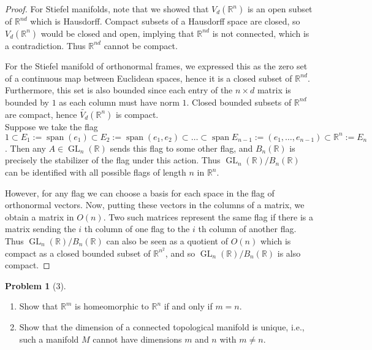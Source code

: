 \documentclass[reqno]{amsart}
\theoremstyle{definition}
\newtheorem{problem}[theorem]{Problem}
\theoremstyle{remark}
\DeclareMathOperator{\Span}{span}
\DeclareMathOperator{\GL}{GL}
\begin{document}
\begin{proof}
For Stiefel manifolds, note that we showed that
$V_d \left( \mathbb{R}^{n} \right) $ 
is an open subset of $\mathbb{R}^{nd}$ which is Hausdorff.
Compact subsets of a Hausdorff space are closed,
so $V_d \left( \mathbb{R}^{n} \right) $ would be
closed and open, implying that  $\mathbb{R}^{nd}$ is
not connected, which is a contradiction. Thus
$\mathbb{R}^{nd}$ cannot be compact.

For the Stiefel manifold of
orthonormal frames, we expressed this as the
zero set of a continuous map between Euclidean spaces,
hence it is a closed subset of
$\mathbb{R}^{nd}$. Furthermore, this set
is also bounded since each entry
of the $n \times d$ matrix is bounded
by $1$ as each column must have norm $1$. 
Closed bounded subsets of $\mathbb{R}^{nd}$ are compact,
hence $\tilde{V_d}\left( \mathbb{R}^{n} \right) $ is 
compact.\\
\linebreak
Suppose
we take the flag
$1 \subset 
E_1 := \Span\left( e_1 \right) \subset 
E_2 := \Span \left( e_1,e_2 \right)\subset \ldots
\subset 
\Span E_{n-1} := \left( e_1, \ldots, e_{n-1} \right) 
\subset \mathbb{R}^{n} := E_n$.
Then any $A \in \GL_n(\mathbb{R})$ sends this
flag to some other flag, and
$B_n(\mathbb{R})$ is precisely the
stabilizer of the flag under this action.
Thus 
$\GL_n(\mathbb{R}) / B_n(\mathbb{R})$ can be
identified with all possible flags
of length  $n$ in $\mathbb{R}^{n}$.

However, for any flag we can choose
a basis for each space in the flag
of orthonormal vectors. Now, putting these
vectors in the columns of a matrix, we obtain
a matrix in $O(n)$. Two such matrices represent the
same flag if there is a matrix sending the
$i$ th column of one flag to the $i$ th column of another
flag. Thus $\GL_n \left( \mathbb{R} \right) /
B_n(\mathbb{R})$ can also be seen as a quotient
of $O(n)$ which is compact as a
closed bounded subset of $\mathbb{R}^{n^2}$, and so
$\GL_n(\mathbb{R})/ B_n(\mathbb{R})$ is also compact.

\end{proof}





\begin{problem}[3]
    \begin{enumerate}
        \item Show that $\mathbb{R}^{m}$ is homeomorphic
            to $\mathbb{R}^{n}$ if and only if
            $m = n$.
        \item Show that the dimension of a connected
            topological manifold is unique, i.e.,
            such a manifold $M$ cannot have dimensions
            $m$ and $n$ with $m \neq n$.
    \end{enumerate}
\end{problem}
\end{document}
